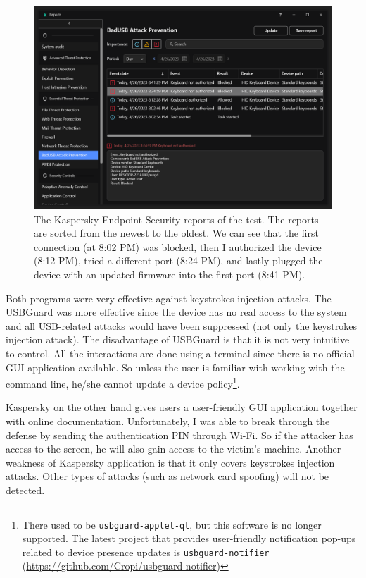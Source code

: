 \begin{figure}[ht]
    \centering
    \includegraphics[width=0.9\linewidth]{./obrazky-figures/kaspersky_report.PNG}
    \caption{The Kaspersky Endpoint Security reports of the test. The reports are sorted from the newest to the oldest. We can see that the first connection (at 8:02 PM) was blocked, then I authorized the device (8:12 PM), tried a different port (8:24 PM), and lastly plugged the device with an updated firmware into the first port (8:41 PM).}
    \label{fig:kaspersky_report}
\end{figure}

Both programs were very effective against keystrokes injection attacks. The USBGuard was more effective since the device has no real access to the system and all USB-related attacks would have been suppressed (not only the keystrokes injection attack). The disadvantage of USBGuard is that it is not very intuitive to control. All the interactions are done using a terminal since there is no official GUI application available. So unless the user is familiar with working with the command line, he/she cannot update a device policy\footnote{There used to be \texttt{usbguard-applet-qt}, but this software is no longer supported. The latest project that provides user-friendly notification pop-ups related to device presence updates is \texttt{usbguard-notifier} (\url{https://github.com/Cropi/usbguard-notifier})}.

Kaspersky on the other hand gives users a user-friendly GUI application together with online documentation. Unfortunately, I was able to break through the defense by sending the authentication PIN through Wi-Fi. So if the attacker has access to the screen, he will also gain access to the victim's machine. Another weakness of Kaspersky application is that it only covers keystrokes injection attacks. Other types of attacks (such as network card spoofing) will not be detected.

